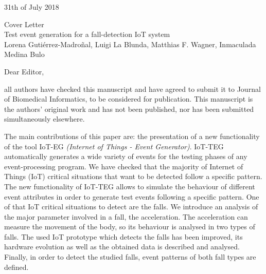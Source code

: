 \documentclass[parskip]{scrartcl}
\begin{document}
 
\pagestyle{empty}

\begin{flushright}
    \Large
    31th of July 2018
\end{flushright}

\begin{center}
    \huge
    Cover Letter\\
    \vspace{0.4cm}
    \LARGE
    Test event generation for a fall-detection IoT system\\
    \vspace{0.4cm}
    \large
    Lorena Gutiérrez-Madroñal, Luigi La Blunda, Matthias F. Wagner, Inmaculada Medina Bulo
\end{center}
 
    \vspace{0.8cm}

    \normalsize
Dear Editor,

all authors have checked this manuscript and have agreed to submit it to Journal of Biomedical Informatics, to be considered for publication.
This manuscript is the authors' original work and has not been published, nor has been submitted simultaneously elsewhere.

The main contributions of this paper are:
the presentation of a new functionality of the tool IoT-EG \textit{(Internet of Things - Event Generator)}. IoT-TEG automatically 
generates a wide variety of events for the testing phases of any event-processing program. We have checked that the majority of 
Internet of Things (IoT) critical situations that want to be detected follow a specific pattern. The new functionality of IoT-TEG 
allows to simulate the behaviour of different event attributes in order to generate test events following a specific pattern. 
One of that IoT critical situations to detect are the falls. We introduce an analysis of the major parameter involved in a fall, 
the acceleration. The acceleration can measure the movement of the body, so its behaviour is analysed in two types of falls. 
The used IoT prototype which detects the falls has been improved, its hardware evolution as well as the obtained data is described 
and analysed. Finally, in order to detect the studied falls, event patterns of both fall types are defined.
\end{document}
